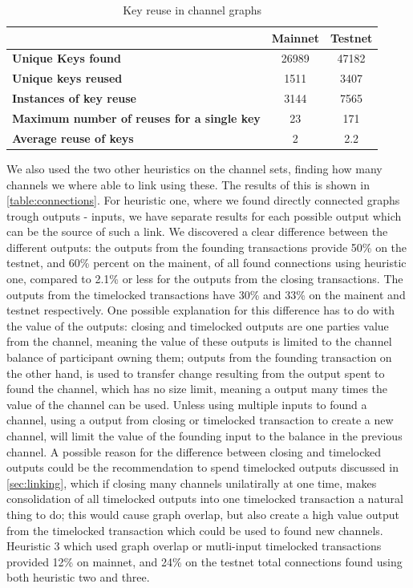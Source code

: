 \begin{table}[ht]
\centering
\caption{Key reuse in channel graphs}
\label{key_reuse_table}
\begin{tabular}{|l|c|c|}
\hline
                                                   & \textbf{Mainnet} & \textbf{Testnet} \\ \hline
\textbf{Unique Keys found}                         & 26989              & 47182            \\ \hline
\textbf{Unique keys reused}                        & 1511               & 3407             \\ \hline
\textbf{Instances of key reuse}                    & 3144             & 7565             \\ \hline
\textbf{Maximum number of reuses for a single key} & 23               & 171              \\ \hline
\textbf{Average reuse of keys}                     & 2              & 2.2              \\ \hline
\end{tabular}
\end{table}

We also used the two other heuristics on the channel sets, finding how many channels we where able to link using these. The results of this is shown in \cref{table:connections}. For heuristic one, where we found directly connected graphs trough outputs - inputs, we have separate results for each possible output which can be the source of such a link. We discovered a clear difference between the different outputs: the outputs from the founding transactions provide 50\% on the testnet, and 60\% percent on the mainent, of all found connections using heuristic one, compared to 2.1\% or less for the outputs from the closing transactions. The outputs from the timelocked transactions have 30\% and 33\% on the mainent and testnet respectively. One possible explanation for this difference has to do with the value of the outputs: closing and timelocked outputs are one parties value from the channel, meaning the value of these outputs is limited to the channel balance of participant owning them; outputs from the founding transaction on the other hand, is used to transfer change resulting from the output spent to found the channel, which has no size limit, meaning a output many times the value of the channel can be used. Unless using multiple inputs to found a channel, using a output from closing or timelocked transaction to create a new channel, will limit the value of the founding input to the balance in the previous channel. A possible reason for the difference between closing and timelocked outputs could be the recommendation to spend timelocked outputs discussed in \cref{sec:linking}, which if closing many channels unilatirally at one time, makes consolidation of all timelocked outputs into one timelocked transaction a natural thing to do; this would cause graph overlap, but also create a high value output from the timelocked transaction which could be used to found new channels. Heuristic 3 which used graph overlap or mutli-input timelocked transactions provided 12\% on mainnet, and 24\% on the testnet total connections found using both heuristic two and three.


